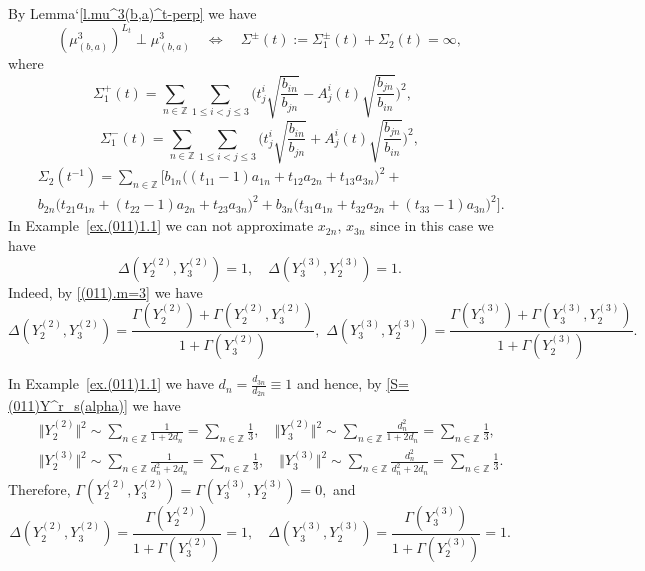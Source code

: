 \documentclass[preprint,12pt]{elsarticle}
\numberwithin{equation}{section}
\begin{document}
By Lemma`\ref{l.mu^3(b,a)^t-perp} we have
$$
(\mu_{(b,a)}^3)^{L_t}\perp\mu_{(b,a)}^3\quad\Leftrightarrow\quad\Sigma^\pm(t):=\Sigma_1^\pm(t)+\Sigma_2(t)=\infty,
$$
where  
\begin{equation*}
\Sigma_1^+(t)\!=\!\sum_{n\in{\mathbb
Z}}
 \sum_{1\leq i<j\leq 3}\Big(t^i_j\sqrt{\frac{b_{in}}{b_{jn}}}\! -\!A^i_j(t)\sqrt{\frac{b_{jn}}{b_{in}}}\Big)^2,\quad 
\end{equation*}
\begin{equation*} 
\Sigma_1^{-}(t)\!=\!\sum_{n\in{\mathbb
Z}}
 \sum_{1\leq i<j\leq 3}\Big(t^i_j\sqrt{\frac{b_{in}}{b_{jn}}}\!+\!A^i_j(t)\sqrt{\frac{b_{jn}}{b_{in}}}\Big)^2,
\end{equation*}
% 
\begin{eqnarray*}
&&\Sigma_2(t^{-1})=\sum_{n\in{\mathbb
Z}}\Big[b_{1n}\big((t_{11}-1)a_{1n}+t_{12}a_{2n}+t_{13}a_{3n}\big)^2+\\
\nonumber
&&
b_{2n}\big(t_{21}a_{1n}+(t_{22}\!-\!1)a_{2n}+t_{23}a_{3n}\big)^2
+b_{3n}\big(t_{31}a_{1n}+t_{32}a_{2n}+(t_{33}\!-\!1)a_{3n}\big)^2\Big].
\end{eqnarray*}
%
In Example~\ref{ex.(011)1.1} we can not approximate 
$x_{2n},\,x_{3n}$ since in this case we have
\begin{equation}
\label{(011),(c)-ex}
\Delta(Y_2^{(2)},Y_3^{(2)})=1,\quad \Delta(Y_3^{(3)},Y_2^{(3)})\!=1.
\end{equation}
%
Indeed, by \eqref{(011).m=3} we have
\begin{equation}
 \Delta(Y_2^{(2)},Y_3^{(2)})=
\!\frac{\Gamma(Y_2^{(2)})\!+\!\Gamma(Y_2^{(2)},Y_3^{(2)})}{1+\Gamma(Y_3^{(2)})},\,\, \Delta(Y_3^{(3)},Y_2^{(3)})=
\frac{\Gamma(Y_3^{(3)})\!+\!\Gamma(Y_3^{(3)},Y_2^{(3)})}{1+\Gamma(Y_2^{(3)})}.
\end{equation}


In Example~\ref{ex.(011)1.1} we have 
$d_n=\frac{d_{3n}}{d_{2n}}\equiv 1$
and hence, by  \eqref{S=(011)Y^r_s(alpha)} 
we have
%
\begin{eqnarray*}
&& \Vert Y_2^{(2)}\Vert^2\sim \sum_{n\in \mathbb Z}\frac{1}{1+2d_n}=\sum_{n\in \mathbb Z}\frac{1}{3},\quad
 \Vert Y_3^{(2)} \Vert^2\sim \sum_{n\in \mathbb Z}\frac{d_n^2}{1+2d_n}=\sum_{n\in \mathbb Z}\frac{1}{3},\\
 \nonumber
&&\Vert Y_2^{(3)} \Vert^2\sim \sum_{n\in \mathbb Z}\frac{1}{d_n^2+2d_n}=\sum_{n\in \mathbb Z}\frac{1}{3},\quad
\Vert Y_3^{(3)}\Vert^2 \sim \sum_{n\in \mathbb Z}\frac{d_n^2}{d_n^2+2d_n}=
\sum_{n\in \mathbb Z}\frac{1}{3}.
\end{eqnarray*}
Therefore,
$
\Gamma(Y_2^{(2)},Y_3^{(2)})
=\Gamma(Y_3^{(3)},Y_2^{(3)})=0,$
and
%
$$
 \Delta(Y_2^{(2)},Y_3^{(2)})=
\!\frac{\Gamma(Y_2^{(2)})
}{1+\Gamma(Y_3^{(2)})}=1,\quad  \Delta(Y_3^{(3)},Y_2^{(3)})=
\frac{\Gamma(Y_3^{(3)})}{1+\Gamma(Y_2^{(3)})}=1.
$$
\end{document}
